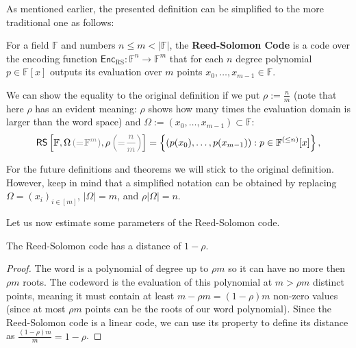 \documentclass[../lecture-notes-148x210.tex]{subfiles}
\begin{document}
As mentioned earlier, the presented definition can be simplified to the more
traditional one as follows:
\begin{definition}
For a field $\mathbb{F}$ and numbers $n \leq m < |\mathbb{F}|$, the
\textbf{Reed-Solomon Code} is a code over the encoding function
$\mathsf{Enc}_{\text{RS}}: \mathbb{F}^n \rightarrow \mathbb{F}^m$ that for each
$n$ degree polynomial $p \in \mathbb{F}[x]$ outputs its evaluation over $m$
points $x_0,\ldots,x_{m-1} \in \mathbb{F}$.
\end{definition}

We can show the equality to the original definition if we put $\rho :=
\frac{n}{m}$ (note that here $\rho$ has an evident meaning: $\rho$ shows how
many times the evaluation domain is larger than the word space) and $\Omega :=
(x_0,\dots,x_{m-1}) \subset \mathbb{F}$: 
\begin{equation*}
    \mathsf{RS}\left[\mathbb{F},\Omega\,\textcolor{gray}{\left(=\hspace{-2px}\mathbb{F}^m\right)}, \rho\,\textcolor{gray}{\left(=\hspace{-2px}\frac{n}{m}\right)}\right] = \left\{(p(x_0),\dots,p(x_{m-1})): p \in \mathbb{F}^{(\leq n)}[x]\right\},
\end{equation*}

\begin{remark}
For the future definitions and theorems we will stick to the original
definition. However, keep in mind that a simplified notation can be obtained by
replacing $\Omega = (x_i)_{i \in [m]}$, $|\Omega| = m$, and $\rho |\Omega| = n$.
\end{remark}

Let us now estimate some parameters of the Reed-Solomon code.
    
\begin{lemma}
The Reed-Solomon code has a distance of $1 - \rho$.
\end{lemma}
\begin{proof}
The word is a polynomial of degree up to $\rho m$ so it can have no more then
$\rho m$ roots. The codeword is the evaluation of this polynomial at $m > \rho
m$ distinct points, meaning it must contain at least $m-\rho m =(1-\rho)m$
non-zero values (since at most $\rho m$ points can be the roots of our word
polynomial). Since the Reed-Solomon code is a linear code, we can use its
property to define its distance as $\frac{(1-\rho)m}{m} = 1-\rho$.
\end{proof}
\end{document}
